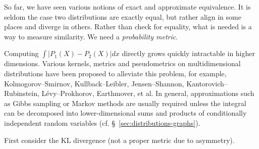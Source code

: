 \documentclass[11pt]{article}
\begin{document}


    \noindent So far, we have seen various notions of exact and approximate equivalence. It is seldom the case two distributions are exactly equal, but rather align in some places and diverge in others. Rather than check for equality, what is needed is a way to measure similarity. We need a \textit{probability metric}.

    \begin{figure}[!h]
    \centering
    \end{figure}

    \noindent Computing $\int |P_1(X) - P_2(X)| dx$ directly grows quickly intractable in higher dimensions. Various kernels, metrics and pseudometrics on multidimensional distributions have been proposed to alleviate this problem, for example, Kolmogorov--Smirnov, Kullback--Leibler, Jensen--Shannon, Kantorovich--Rubinstein,  Lévy--Prokhorov, Earthmover, et al. In general, approximations such as Gibbs sampling or Markov methods are usually required unless the integral can be decomposed into lower-dimensional sums and products of conditionally independent random variables (cf. \S~\ref{sec:distributions-graphs}).

  \noindent First consider the KL divergence (not a proper metric due to asymmetry).
\end{document}
